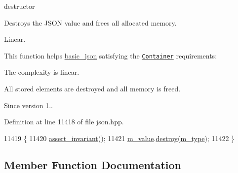destructor 

Destroys the J\+S\+ON value and frees all allocated memory.

Linear.

This function helps {\ttfamily \hyperlink{classnlohmann_1_1basic__json}{basic\+\_\+json}} satisfying the \href{http://en.cppreference.com/w/cpp/concept/Container}{\tt Container} requirements\+:
\begin{DoxyItemize}
\item The complexity is linear.
\item All stored elements are destroyed and all memory is freed.
\end{DoxyItemize}

\begin{DoxySince}{Since}
version 1.. 
\end{DoxySince}


Definition at line 11418 of file json.\+hpp.


\begin{DoxyCode}
11419     \{
11420         \hyperlink{classnlohmann_1_1basic__json_a4a82d3fb7a111641decf35c2fb707c7f}{assert\_invariant}();
11421         \hyperlink{classnlohmann_1_1basic__json_aeb0814f76966f99290cb29e127c90a77}{m\_value}.\hyperlink{unionnlohmann_1_1basic__json_1_1json__value_ad54d0055a5cbb83b7ebe9c0950afd398}{destroy}(\hyperlink{classnlohmann_1_1basic__json_a91990b60d7d4d67968a2c1db677536e7}{m\_type});
11422     \}
\end{DoxyCode}


\subsection{Member Function Documentation}
\mbox{\label{classnlohmann_1_1basic__json_a776868dd5f9892564c1f6c786d1f80a3}} 
